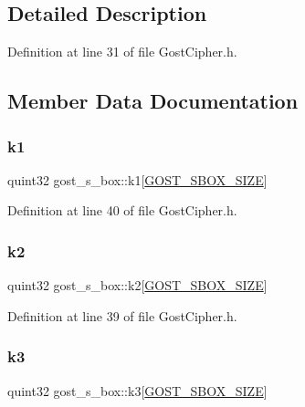 \subsection{Detailed Description}


Definition at line 31 of file Gost\+Cipher.\+h.



\subsection{Member Data Documentation}
\mbox{\label{structgost__s__box_a8bc525703cffca48fe5249ec7cd6b7df}} 
\subsubsection{\texorpdfstring{k1}{k1}}
{\footnotesize\ttfamily quint32 gost\+\_\+s\+\_\+box\+::k1\mbox{[}\hyperlink{_gost_cipher_8h_aa62d143b3b91c5333e7835aaf1c3b2de}{G\+O\+S\+T\+\_\+\+S\+B\+O\+X\+\_\+\+S\+I\+ZE}\mbox{]}}



Definition at line 40 of file Gost\+Cipher.\+h.

\mbox{\label{structgost__s__box_aaf6934ab0ba46babb815c0283c421640}} 
\subsubsection{\texorpdfstring{k2}{k2}}
{\footnotesize\ttfamily quint32 gost\+\_\+s\+\_\+box\+::k2\mbox{[}\hyperlink{_gost_cipher_8h_aa62d143b3b91c5333e7835aaf1c3b2de}{G\+O\+S\+T\+\_\+\+S\+B\+O\+X\+\_\+\+S\+I\+ZE}\mbox{]}}



Definition at line 39 of file Gost\+Cipher.\+h.

\mbox{\label{structgost__s__box_ac297a9acd3981830afca19b711b3eefe}} 
\subsubsection{\texorpdfstring{k3}{k3}}
{\footnotesize\ttfamily quint32 gost\+\_\+s\+\_\+box\+::k3\mbox{[}\hyperlink{_gost_cipher_8h_aa62d143b3b91c5333e7835aaf1c3b2de}{G\+O\+S\+T\+\_\+\+S\+B\+O\+X\+\_\+\+S\+I\+ZE}\mbox{]}}




